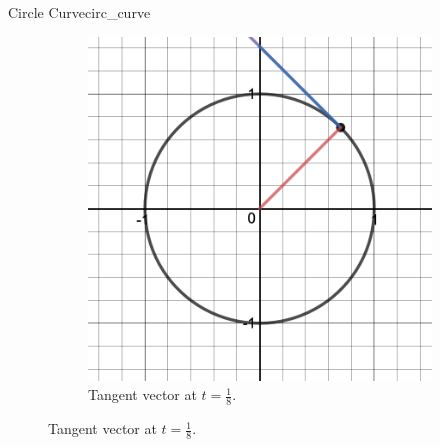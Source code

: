 \begin{ex}{Circle Curve}{circ_curve}
\begin{figure}[H]
\begin{subfigure}[h]{0.45\textwidth}
        \includegraphics[width=\textwidth]{Figures_Part_6/circ_tang_2.png}
        \caption{Tangent vector at $t=\frac{1}{8}$.}
    \end{subfigure}
    

\end{figure}
\end{ex}
